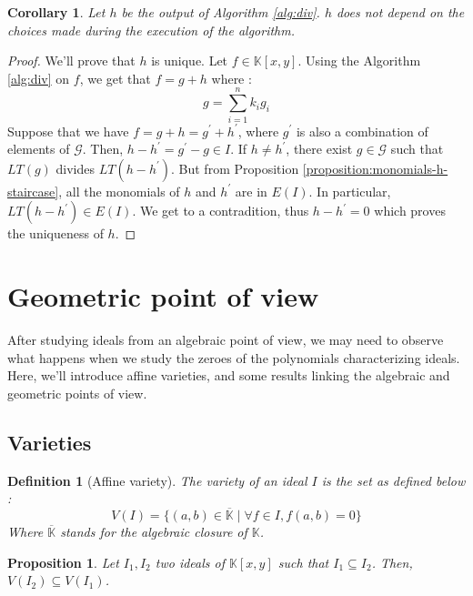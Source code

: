 \documentclass{article}
\newtheorem{corollary}{Corollary}[theorem]
\newtheorem{definition}{Definition}[section]
\newtheorem{proposition}{Proposition}[section]
\begin{document}
\begin{corollary}
    Let $h$ be the output of Algorithm \ref{alg:div}. $h$ does not depend on the choices made during the execution of the algorithm.
\end{corollary}

\begin{proof}
    We'll prove that $h$ is unique. Let $f \in \mathbb{K}[x, y]$. Using the Algorithm \ref{alg:div} on $f$, we get that $f = g + h$ where : 
    \begin{displaymath}
        g = \sum_{i = 1}^{n} k_{i}g_{i} 
    \end{displaymath}
    Suppose that we have $f = g + h = g^{\prime} + h^{\prime}$, where $g^{\prime}$ is also a combination of elements of $\mathscr{G}$. Then, $h - h^{\prime} = g^{\prime} - g \in I$. If $h \neq h^{\prime}$, there exist $g \in \mathscr{G}$ such that $LT(g)$ divides $LT(h - h^{\prime})$. But from Proposition \ref{proposition:monomials-h-staircase}, all the monomials of $h$ and $h^{\prime}$ are in $E(I)$. In particular, $LT(h - h^{\prime}) \in E(I)$. We get to a contradition, thus $h - h^{\prime} = 0$ which proves the uniqueness of $h$.
\end{proof}

\section{Geometric point of view}

After studying ideals from an algebraic point of view, we may need to observe what happens when we study the zeroes of the polynomials characterizing ideals. Here, we'll introduce affine varieties, and some results linking the algebraic and geometric points of view.

\subsection*{Varieties}

\begin{definition} [Affine variety]
    The variety of an ideal $I$ is the set as defined below : 
    \begin{displaymath}
        V(I) = \{ (a, b) \in \overline{\mathbb{K}} \mid \forall f \in I, f(a, b) = 0 \}
    \end{displaymath}
    Where $\overline{\mathbb{K}}$ stands for the algebraic closure of $\mathbb{K}$. 
\end{definition}

\begin{proposition}
    Let $I_{1}, I_{2}$ two ideals of $\mathbb{K}[x, y]$ such that $I_{1} \subseteq I_{2}$. Then, $V(I_{2}) \subseteq V(I_{1})$.
\end{proposition}
\end{document}
